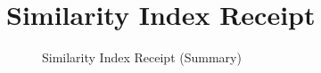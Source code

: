 \chapter{Similarity Index Receipt}
\begin{figure}[h]
    \centering
    \setlength{\fboxsep}{0pt}
    \caption{Similarity Index Receipt (Summary)}
    \label{fig:myfig84}
\end{figure}
\clearpage
